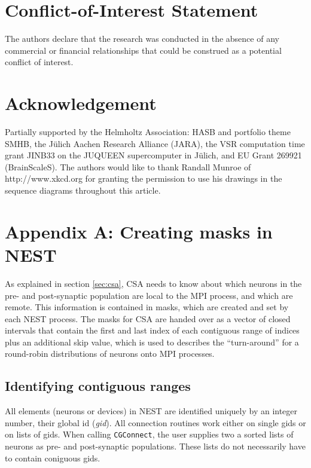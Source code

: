 \documentclass{frontiersSCNS} %
\begin{document}

\section*{Conflict-of-Interest Statement}
The authors declare that the research was conducted in the absence of
any commercial or financial relationships that could be construed as a
potential conflict of interest.

\section*{Acknowledgement}
Partially supported by the Helmholtz Association: HASB and portfolio
theme SMHB, the Jülich Aachen Research Alliance (JARA), the VSR
computation time grant JINB33 on the JUQUEEN supercomputer in Jülich,
and EU Grant 269921 (BrainScaleS). The authors would like to thank
Randall Munroe of http://www.xkcd.org for granting the permission to
use his drawings in the sequence diagrams throughout this article.

\section*{Appendix A: Creating masks in NEST}\label{sec:creating_masks}

As explained in section \ref{sec:csa}, CSA needs to know about which
neurons in the pre- and post-synaptic population are local to the MPI
process, and which are remote. This information is contained in masks,
which are created and set by each NEST process. The masks for CSA are
handed over as a vector of closed intervals that contain the first and
last index of each contiguous range of indices plus an additional skip
value, which is used to describes the ``turn-around'' for a round-robin
distributions of neurons onto MPI processes.

\subsection*{Identifying contiguous ranges}

All elements (neurons or devices) in NEST are identified uniquely by
an integer number, their global id (\emph{gid}). All connection
routines work either on single gids or on lists of gids. When calling
\texttt{CGConnect}, the user supplies two a sorted lists of neurons as
pre- and post-synaptic populations. These lists do not necessarily
have to contain coniguous gids.
\end{document}
